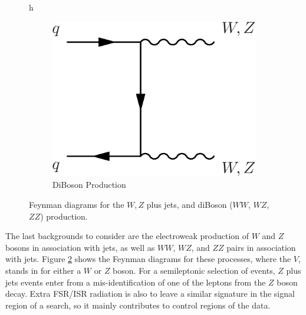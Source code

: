 \begin{figure}{h}
\begin{subfigure}[h]{0.3\textwidth}
        \includegraphics[width=\textwidth]{Figures/Feynman_Diagrams/backgrounds__VV.pdf}
        \caption{DiBoson Production}\label{fd:VV}
      \end{subfigure}
      \caption{Feynman diagrams for the $W,Z$ plus jets, and diBoson
        ($WW$, $WZ$, $ZZ$) production.} \label{fig:feynman_diagrams__Vjets__VV}
\end{figure}

\par The last backgrounds to consider are the electroweak production
of $W$ and $Z$ bosons in association with jets, as well as $WW$, $WZ$, and
$ZZ$ pairs in association with jets.  Figure
\ref{fig:feynman_diagrams__Vjets__VV} shows the Feynman diagrams for
these processes, where the $V$, stands in for either a $W$ or $Z$
boson.  For a semileptonic selection of \ttH events, $Z$ plus jets
events enter from a mis-identification of one of the leptons from the
$Z$ boson decay.  Extra FSR/ISR radiation is also to leave a similar
signature in the signal region of a \ttH search, so it mainly
contributes to control regions of the data.  

